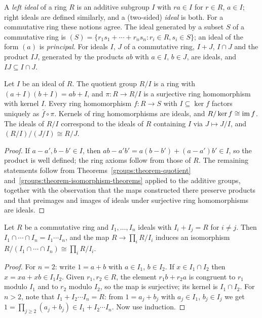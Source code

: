 \begin{definition}\label{rings:definition-ideal}
A \emph{left ideal} of a ring $R$ is an additive subgroup $I$ with $ra \in I$ for
$r \in R$, $a \in I$; right ideals are defined similarly, and a (two-sided)
\emph{ideal} is both. For a commutative ring these notions agree. The ideal
generated by a subset $S$ of a commutative ring is
$(S) = \{r_1 s_1 + \cdots + r_n s_n : r_i \in R, s_i \in S\}$; an ideal of the form
$(a)$ is \emph{principal}. For ideals $I$, $J$ of a commutative ring, $I + J$,
$I \cap J$ and the product $IJ$, generated by the products $ab$ with $a \in I$,
$b \in J$, are ideals, and $IJ \subseteq I \cap J$.
\end{definition}

\begin{theorem}\label{rings:theorem-quotient-ring}
Let $I$ be an ideal of $R$. The quotient group $R/I$ is a ring with
$(a + I)(b + I) = ab + I$, and $\pi \colon R \to R/I$ is a surjective ring homomorphism
with kernel $I$. Every ring homomorphism $f \colon R \to S$ with $I \subseteq \ker f$ factors
uniquely as $\bar f \circ \pi$. Kernels of ring homomorphisms are ideals, and
$R/\ker f \cong \operatorname{im} f$. The ideals of $R/I$ correspond to the ideals of $R$ containing
$I$ via $J \mapsto J/I$, and $(R/I)/(J/I) \cong R/J$.
\end{theorem}

\begin{proof}
If $a - a', b - b' \in I$, then $ab - a'b' = a(b - b') + (a - a')b' \in I$, so the
product is well defined; the ring axioms follow from those of $R$. The remaining
statements follow from Theorems~\ref{groups:theorem-quotient}
and~\ref{groups:theorem-isomorphism-theorems} applied to the additive groups,
together with the observation that the maps constructed there preserve products
and that preimages and images of ideals under surjective ring homomorphisms are
ideals.
\end{proof}

\begin{theorem}\label{rings:theorem-chinese-remainder}
Let $R$ be a commutative ring and $I_1, \ldots, I_n$ ideals with $I_i + I_j = R$ for
$i \neq j$. Then $I_1 \cap \cdots \cap I_n = I_1 \cdots I_n$, and the map
$R \to \prod_i R/I_i$ induces an isomorphism $R/(I_1 \cap \cdots \cap I_n) \cong \prod_i R/I_i$.
\end{theorem}

\begin{proof}
For $n = 2$: write $1 = a + b$ with $a \in I_1$, $b \in I_2$. If $x \in I_1 \cap I_2$ then
$x = xa + xb \in I_1I_2$. Given $r_1, r_2 \in R$, the element $r_1 b + r_2 a$ is congruent
to $r_1$ modulo $I_1$ and to $r_2$ modulo $I_2$, so the map is surjective; its kernel
is $I_1 \cap I_2$. For $n > 2$, note that $I_1 + I_2 \cdots I_n = R$: from
$1 = a_j + b_j$ with $a_j \in I_1$, $b_j \in I_j$ we get
$1 = \prod_{j \geq 2}(a_j + b_j) \in I_1 + I_2 \cdots I_n$. Now use induction.
\end{proof}

